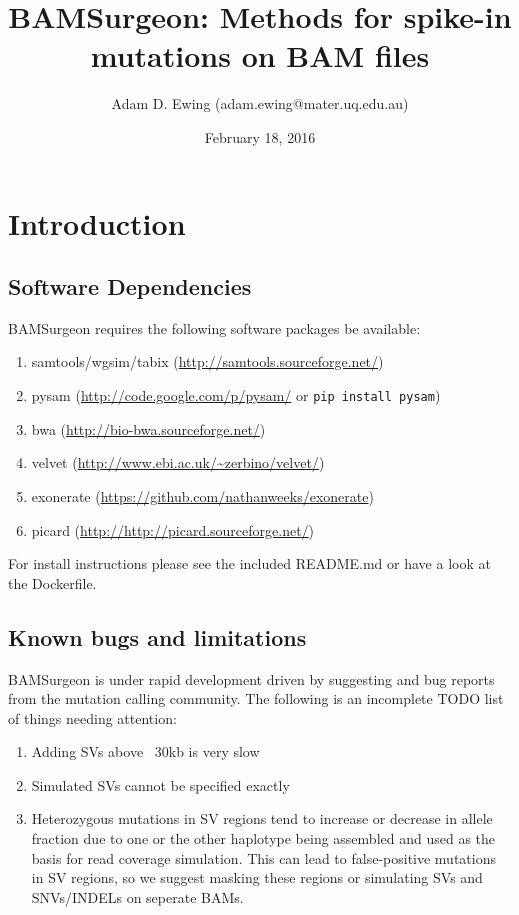 \documentclass[letterpaper,11pt]{article}
\title{BAMSurgeon: Methods for spike-in mutations on BAM files}
\author{Adam D. Ewing (adam.ewing@mater.uq.edu.au)}
\begin{document}
 \date{February 18, 2016}
 \maketitle

\section{Introduction}
\subsection{Software Dependencies}
BAMSurgeon requires the following software packages be available:

\begin{enumerate}
  \item samtools/wgsim/tabix (\url{http://samtools.sourceforge.net/})
  \item pysam (\url{http://code.google.com/p/pysam/} or \texttt{pip install pysam})
  \item bwa (\url{http://bio-bwa.sourceforge.net/})
  \item velvet (\url{http://www.ebi.ac.uk/~zerbino/velvet/})
  \item exonerate (\url{https://github.com/nathanweeks/exonerate})
  \item picard (\url{http://http://picard.sourceforge.net/})
\end{enumerate}

For install instructions please see the included README.md or have a look at the Dockerfile.


\subsection{Known bugs and limitations}
BAMSurgeon is under rapid development driven by suggesting and bug reports from the mutation calling community. The following is an incomplete TODO list of things needing attention:

\begin{enumerate}
\item Adding SVs above ~30kb is very slow
\item Simulated SVs cannot be specified exactly
\item Heterozygous mutations in SV regions tend to increase or decrease in allele fraction due to one or the other haplotype being assembled and used as the basis for read coverage simulation. This can lead to false-positive mutations in SV regions, so we suggest masking these regions or simulating SVs and SNVs/INDELs on seperate BAMs.
\end{enumerate}
\end{document}
